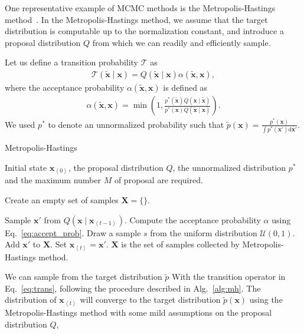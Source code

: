 \documentclass{now}
\newcommand{\qt}[1]{\left<#1\right>}
\newcommand{\vect}[1]{\mathbf{#1}}
\newcommand{\vx}[0]{\vect{x}}
\newcommand{\T}[0]{\mathcal{T}}
\newcommand{\dd}[1]{\text{d}{#1}}
\begin{document}
One representative example of MCMC methods is the Metropolis-Hastings
method~\citep{Hastings1970}. In the Metropolis-Hastings method, we assume that
the target distribution is computable up to the normalization constant, and
introduce a proposal distribution $Q$ from which we can readily and efficiently
sample.

Let us define a transition probability $\T$ as
\begin{align}
    \label{eq:trans}
    \T(\tilde{\vx} \mid \vx) = Q(\tilde{\vx}\mid \vx)
    \alpha(\tilde{\vx}, \vx),
\end{align}
where the acceptance probability $\alpha(\tilde{\vx}, \vx)$ is defined as
\begin{align}
    \label{eq:accept_prob}
    \alpha(\tilde{\vx}, \vx) = \min \left(1, 
    \frac{p^*(\tilde{\vx})Q(\vx \mid \tilde{\vx})}
    {p^*(\vx)Q(\tilde{\vx} \mid \vx)} \right).
\end{align}
We used $p^*$ to denote an unnormalized probability such that $\tilde{p}(\vx) =
\tfrac{p^*(\vx)}{\int p^*(\vx') \dd{\vx'}}$.

\begin{algorithm}[tb]
    \caption[Metropolis-Hastings Method]{Metropolis-Hastings}
    \label{alg:mh}
    \begin{algorithmic}
        \STATE Initial state $\vx_{\qt{0}}$, the proposal
        distribution $Q$, the unnormalized distribution
        $p^*$ and the maximum number $M$ of proposal are required.

        \STATE Create an empty set of samples $\boldsymbol{X}=\{\}$.

        \STATE Sample $\vx'$ from $Q(\vx \mid
        \vx_{\qt{t-1}})$.
        \STATE Compute the acceptance probability
        $\alpha$ using Eq.~\eqref{eq:accept_prob}.
        \STATE Draw a sample $s$ from the uniform distribution
        $\mathcal{U}(0, 1)$.
        \STATE Add $\vx'$ to $\boldsymbol{X}$.
        \STATE Set $\vx_{\qt{t}} = \vx'$.
        \ENDIF
        \ENDFOR
        \STATE
        $\boldsymbol{X}$ is the set of samples collected by
        Metropolis-Hastings method.
    \end{algorithmic}
\end{algorithm}

We can sample from the target distribution $\tilde{p}$ With the transition
operator in Eq.~\eqref{eq:trans}, following the procedure described in
Alg.~\ref{alg:mh}.  The distribution of $\vx_{\qt{t}}$ will converge to the
target distribution $\tilde{p}(\vx)$ using the Metropolis-Hastings method
with some mild assumptions on the proposal distribution $Q$,
\end{document}
